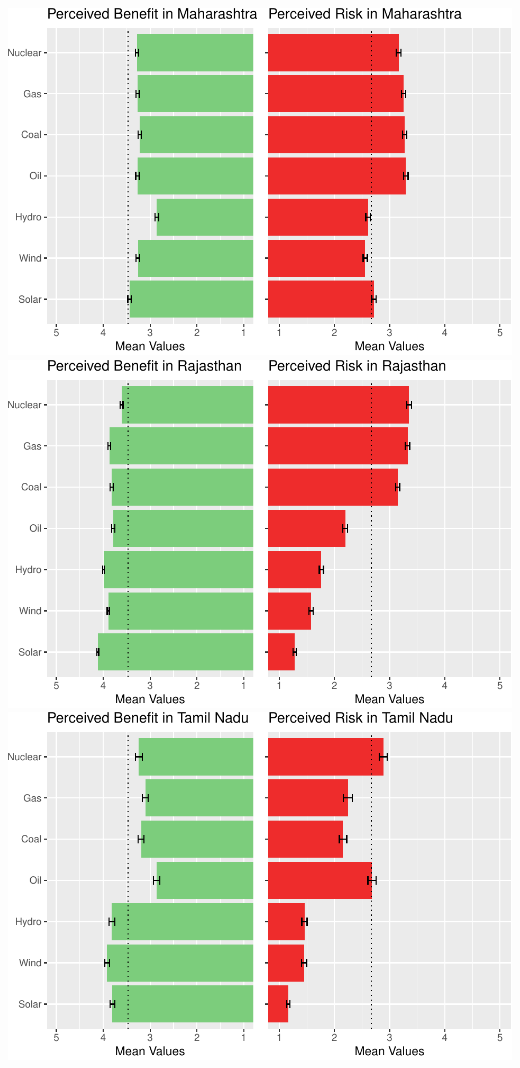 \documentclass[
]{article}
\begin{document}
\includegraphics{nuclear-in-comparison_files/figure-latex/unnamed-chunk-18-1.pdf}
\includegraphics{nuclear-in-comparison_files/figure-latex/unnamed-chunk-18-2.pdf}
\includegraphics{nuclear-in-comparison_files/figure-latex/unnamed-chunk-18-3.pdf}
\end{document}
